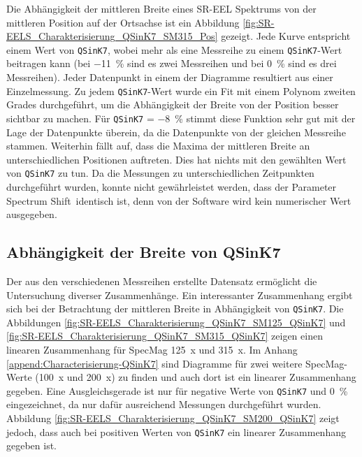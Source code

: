 \documentclass[
	paper=a4,				%
	twoside=true,			%
	BCOR=6mm,				%
	fontsize=12pt,			%
	pagesize=auto,			%
	numbers=noenddot,		%
	bibliography=totoc,		%
	draft=false
]{scrartcl}
\begin{document}
Die Abhängigkeit der mittleren Breite eines SR-EEL Spektrums von der mittleren Position auf der Ortsachse ist ein Abbildung \ref{fig:SR-EELS_Charakterisierung_QSinK7_SM315_Pos} gezeigt. Jede Kurve entspricht einem Wert von \texttt{QSinK7}, wobei mehr als eine Messreihe zu einem \texttt{QSinK7}-Wert beitragen kann (bei \SI{-11}{\percent} sind es zwei Messreihen und bei \SI{0}{\percent} sind es drei Messreihen). Jeder Datenpunkt in einem der Diagramme resultiert aus einer Einzelmessung. Zu jedem \texttt{QSinK7}-Wert wurde ein Fit mit einem Polynom zweiten Grades durchgeführt, um die Abhängigkeit der Breite von der Position besser sichtbar zu machen. Für \texttt{QSinK7} = \SI{-8}{\percent} stimmt diese Funktion sehr gut mit der Lage der Datenpunkte überein, da die Datenpunkte von der gleichen Messreihe stammen. Weiterhin fällt auf, dass die Maxima der mittleren Breite an unterschiedlichen Positionen auftreten. Dies hat nichts mit den gewählten Wert von \texttt{QSinK7} zu tun. Da die Messungen zu unterschiedlichen Zeitpunkten durchgeführt wurden, konnte nicht gewährleistet werden, dass der Parameter \glqq Spectrum Shift\grqq\ identisch ist, denn von der Software wird kein numerischer Wert ausgegeben.


\subsection{Abhängigkeit der Breite von QSinK7} \label{append:Characterisierung-Width-vs-QSinK7}

Der aus den verschiedenen Messreihen erstellte Datensatz ermöglicht die Untersuchung diverser Zusammenhänge. Ein interessanter Zusammenhang ergibt sich bei der Betrachtung der mittleren Breite in Abhängigkeit von \texttt{QSinK7}. Die Abbildungen \ref{fig:SR-EELS_Charakterisierung_QSinK7_SM125_QSinK7} und \ref{fig:SR-EELS_Charakterisierung_QSinK7_SM315_QSinK7} zeigen einen linearen Zusammenhang für SpecMag \SI{125}{x} und \SI{315}{x}. Im Anhang \ref{append:Characterisierung-QSinK7} sind Diagramme für zwei weitere SpecMag-Werte (\SI{100}{x} und \SI{200}{x}) zu finden und auch dort ist ein linearer Zusammenhang gegeben. Eine Ausgleichsgerade ist nur für negative Werte von \texttt{QSinK7} und \SI{0}{\percent} eingezeichnet, da nur dafür ausreichend Messungen durchgeführt wurden. Abbildung \ref{fig:SR-EELS_Charakterisierung_QSinK7_SM200_QSinK7} zeigt jedoch, dass auch bei positiven Werten von \texttt{QSinK7} ein linearer Zusammenhang gegeben ist.
\end{document}
